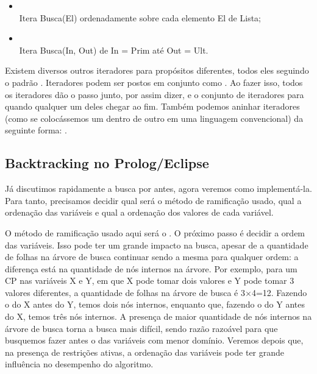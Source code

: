 \documentclass{article}
\begin{document}
\begin{itemize}
\item {}  \\ Itera Busca(El)
  ordenadamente sobre cada elemento El de Lista;
\item {}
  \\ Itera Busca(In, Out) de In = Prim até Out = Ult.
\end{itemize}

Existem diversos outros iteradores para propósitos diferentes, todos
eles seguindo o padrão . Iteradores podem ser postos em conjunto como
. Ao fazer
isso, todos os iteradores dão o passo junto, por assim dizer, e o
conjunto de iteradores para quando qualquer um deles chegar ao
fim. Também podemos aninhar iteradores (como se colocássemos um
 dentro de outro em uma linguagem convencional) da
seguinte forma: .

\subsection{Backtracking no Prolog/Eclipse}

Já discutimos rapidamente a busca por  antes,
agora veremos como implementá-la. Para tanto, precisamos decidir qual
será o método de ramificação usado, qual a ordenação das variáveis e
qual a ordenação dos valores de cada variável.

O método de ramificação usado aqui será o . O
próximo passo é decidir a ordem das variáveis. Isso pode ter um grande
impacto na busca, apesar de a quantidade de folhas na árvore de busca
continuar sendo a mesma para qualquer ordem: a diferença está na
quantidade de nós internos na árvore. Por exemplo, para um CP nas
variáveis X e Y, em que X pode tomar dois valores e Y pode tomar 3
valores diferentes, a quantidade de folhas na árvore de busca é
3$\times$4=12. Fazendo o  do X antes do Y, temos
dois nós internos, enquanto que, fazendo o  do Y
antes do X, temos três nós internos. A presença de maior quantidade de
nós internos na árvore de busca torna a busca mais difícil, sendo
razão razoável para que busquemos fazer antes o 
das variáveis com menor domínio. Veremos depois que, na presença de
restrições ativas, a ordenação das variáveis pode ter grande
influência no desempenho do algoritmo.
\end{document}
